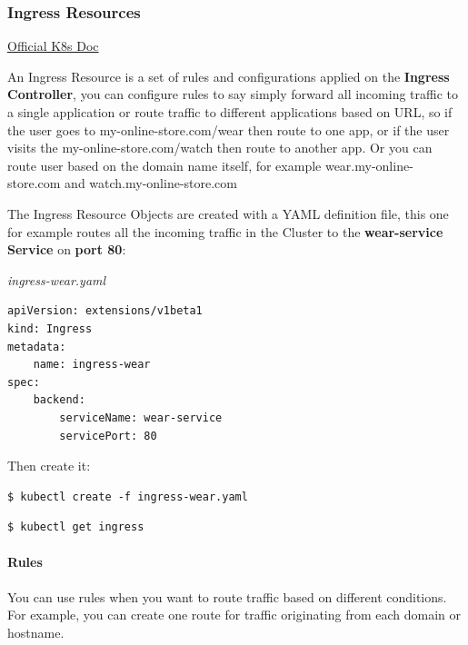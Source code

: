 \documentclass{article}
\newenvironment{codetemplate}[1][]{%
  \mybasecolorbox[#1]
  \itshape
}{%
  \endmybasecolorbox
}
\begin{document}
\subsubsection{Ingress Resources}

\href{https://kubernetes.io/docs/concepts/services-networking/ingress/}{Official K8s Doc}

An Ingress Resource is a set of rules and configurations applied on the \textbf{Ingress Controller}, you can configure rules to say simply forward all incoming traffic to a single application or route traffic to different applications based on URL, so if the user  goes to my-online-store.com/wear then route to one app, or if the user visits the my-online-store.com/watch then route to another app. Or you can route user based on the domain name itself, for example wear.my-online-store.com and watch.my-online-store.com

The Ingress Resource Objects are created with a YAML definition file, this one for example routes all the incoming traffic in the Cluster to the \textbf{wear-service Service} on \textbf{port 80}:

\begin{codetemplate}{ingress-wear.yaml}
\begin{verbatim}
apiVersion: extensions/v1beta1
kind: Ingress
metadata:
    name: ingress-wear
spec:
    backend:
        serviceName: wear-service
        servicePort: 80
\end{verbatim}
\end{codetemplate}

Then create it:

\begin{codetemplate}{}
\begin{verbatim}
$ kubectl create -f ingress-wear.yaml
\end{verbatim}
\end{codetemplate}

\begin{codetemplate}{}
\begin{verbatim}
$ kubectl get ingress
\end{verbatim}
\end{codetemplate}

\paragraph{Rules}

You can use rules when you want to route traffic based on different conditions. For example, you can create one route for traffic originating from each domain or hostname. 
\end{document}
